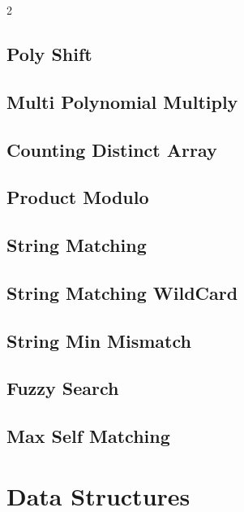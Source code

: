\documentclass[10pt,a4paper]{extarticle}
\begin{document}
\begin{landscape}
\begin{multicols}{2}
\subsection{Poly Shift}


\subsection{Multi Polynomial Multiply}


\subsection{Counting Distinct Array}


\subsection{Product Modulo}


\subsection{String Matching}


\subsection{String Matching WildCard}


\subsection{String Min Mismatch}


\subsection{Fuzzy Search}


\subsection{Max Self Matching}


\section{Data Structures}


\end{multicols}
\end{landscape}
\end{document}
